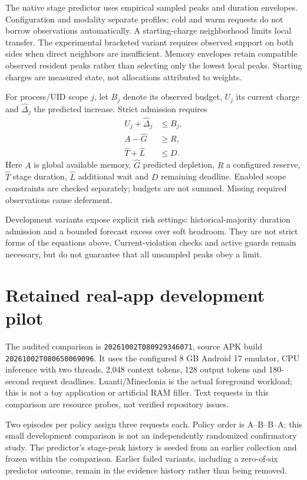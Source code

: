 \documentclass[10pt,twocolumn]{article}
\begin{document}
The native stage predictor uses empirical sampled peaks and duration envelopes.
Configuration and modality separate profiles; cold and warm requests do not
borrow observations automatically. A starting-charge neighborhood limits local
transfer. The experimental bracketed variant requires observed support on both
sides when direct neighbors are insufficient. Memory envelopes retain compatible
observed resident peaks rather than selecting only the lowest local peaks.
Starting charges are measured state, not allocations attributed to weights.

For process/UID scope $j$, let $B_j$ denote its observed budget, $U_j$ its current
charge and $\widehat\Delta_j$ the predicted increase. Strict admission requires
\begin{align}
 U_j+\widehat\Delta_j &\le B_j,\\
 A-\widehat G &\ge R,\\
 \widehat T+\widehat L &\le D.
\end{align}
Here $A$ is global available memory, $\widehat G$ predicted depletion, $R$ a
configured reserve, $\widehat T$ stage duration, $\widehat L$ additional wait and
$D$ remaining deadline. Enabled scope constraints are checked separately; budgets
are not summed. Missing required observations cause deferment.

Development variants expose explicit risk settings: historical-majority duration
admission and a bounded forecast excess over soft headroom. They are not strict
forms of the equations above. Current-violation checks and active guards remain
necessary, but do not guarantee that all unsampled peaks obey a limit.

\section{Retained real-app development pilot}
The audited comparison is \texttt{20261002T080929346071}, source APK build
\texttt{20261002T080650069096}. It uses the configured 8 GB Android 17 emulator,
CPU inference with two threads, 2,048 context tokens, 128 output tokens and
180-second request deadlines. Luanti/Mineclonia is the actual foreground workload;
this is not a toy application or artificial RAM filler. Text requests in this
comparison are resource probes, not verified repository issues.

Two episodes per policy assign three requests each. Policy order is A--B--B--A;
this small development comparison is not an independently randomized confirmatory
study. The predictor's stage-peak history is seeded from an earlier collection and frozen within the
comparison. Earlier failed variants, including a zero-of-six predictor outcome,
remain in the evidence history rather than being removed.
\end{document}
